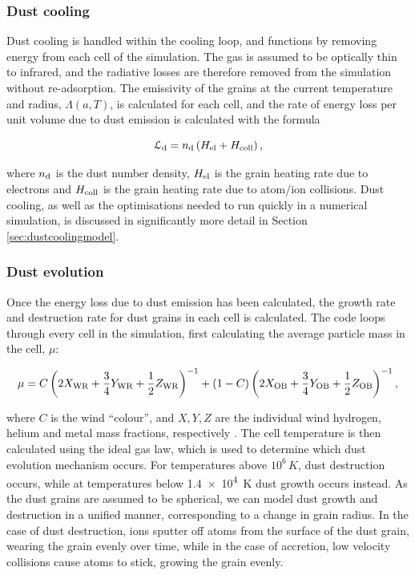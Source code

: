 \subsubsection{Dust cooling}

Dust cooling is handled within the cooling loop, and functions by removing energy from each cell of the simulation.
The gas is assumed to be optically thin to infrared, and the radiative losses are therefore removed from the simulation without re-adsorption.
The emissivity of the grains at the current temperature and radius, $\Lambda(a,T)$, is calculated for each cell, and the rate of energy loss per unit volume due to dust emission is calculated with the formula


\begin{equation}
  \mathcal{L}_\text{d} = n_\text{d} \left( H_\text{el} + H_\text{coll} \right) , 
\end{equation}

\noindent
where $n_\text{d}$ is the dust number density, $H_\text{el}$ is the grain heating rate due to electrons and $H_\text{coll}$ is the grain heating rate due to atom/ion collisions.
Dust cooling, as well as the optimisations needed to run quickly in a numerical simulation, is discussed in significantly more detail in Section \ref{sec:dustcoolingmodel}.

\subsubsection{Dust evolution}

Once the energy loss due to dust emission has been calculated, the growth rate and destruction rate for dust grains in each cell is calculated.
The code loops through every cell in the simulation, first calculating the average particle mass in the cell, $\mu$:

\begin{equation}
  \mu = C \left(2 X_\text{WR} + \frac{3}{4} Y_\text{WR} + \frac{1}{2} Z_\text{WR} \right)^{-1} + (1-C) \left(2 X_\text{OB} + \frac{3}{4} Y_\text{OB} + \frac{1}{2} Z_\text{OB} \right)^{-1} ,
\end{equation}

\noindent
where $C$ is the wind ``colour'', and $X,Y,Z$ are the individual wind hydrogen, helium and metal mass fractions, respectively
\parencite{mihalasStellarAtmospheres1978}.
The cell temperature is then calculated using the ideal gas law, which is used to determine which dust evolution mechanism occurs.
For temperatures above $10^6 \, \si{K}$, dust destruction occurs, while at temperatures below \SI{1.4e4}{K} dust growth occurs instead.
As the dust grains are assumed to be spherical, we can model dust growth and destruction in a unified manner, corresponding to a change in grain radius.
In the case of dust destruction, ions sputter off atoms from the surface of the dust grain, wearing the grain evenly over time, while in the case of accretion, low velocity collisions cause atoms to stick, growing the grain evenly.

